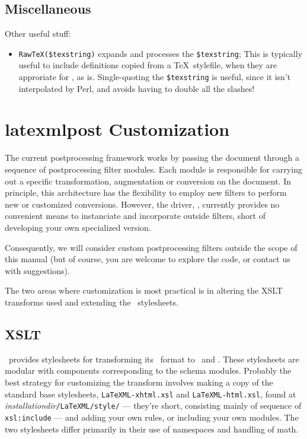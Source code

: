 \documentclass{book}
\newcommand{\ltxcode}{\lstinline[style=latexml]}
\begin{document}
\subsection{Miscellaneous}\label{customization.latexml.misc}
Other useful stuff:
\begin{itemize}
\item \ltxcode|RawTeX($texstring)| expands and processes the \ltxcode|$texstring|;
This is typically useful to include definitions copied from a \TeX\ stylefile,
when they are approriate for \LaTeXML, as is.
Single-quoting the \ltxcode|$texstring| is useful, since it isn't interpolated
by Perl, and avoids having to double all the slashes!
\end{itemize}


\section{latexmlpost Customization}\label{customization.latexmlpost}
The current postprocessing framework works by passing the document through
a sequence of postprocessing filter modules. Each module is responsible
for carrying out a specific transformation, augmentation or conversion
on the document.   In principle, this architecture has the flexibility to
employ new filters to perform new or customized conversions.
However, the driver, , currently provides no
convenient means to instanciate and incorporate outside filters, short
of developing your own specialized version.

Consequently, we will consider custom postprocessing filters outside
the scope of this manual (but of course, you are welcome to explore
the code, or contact us with suggestions).

The two areas where customization is most practical is in altering
the XSLT transforms used and extending the \CSS\ stylesheets.

\subsection{XSLT}\label{customization.latexmlpost.xslt}
\LaTeXML\ provides stylesheets for transforming its \XML\ format
to \XHTML\ and \HTML. These stylesheets are modular with components
corresponding to the schema modules.  Probably the best strategy
for customizing the transform involves making a copy of the standard
base stylesheets, \texttt{LaTeXML-xhtml.xsl} and
\texttt{LaTeXML-html.xsl},  found at
\textit{installationdir}\texttt{/LaTeXML/style/}
--- they're short, consisting mainly of sequence of  \texttt{xsl:include} ---
and adding your own rules, or including your own modules.
The two stylesheets differ primarily in their use of namespaces
and handling of math.
\end{document}
